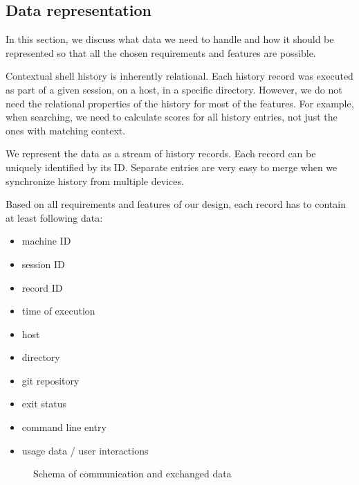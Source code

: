 \subsection{Data representation}

In this section, we discuss what data we need to handle and how it should be represented so that all the chosen requirements and features are possible.


Contextual shell history is inherently relational. Each history record was executed as part of a given session, on a host, in a specific directory. However, we do not need the relational properties of the history for most of the features. For example, when searching, we need to calculate scores for all history entries, not just the ones with matching context. 

We represent the data as a stream of history records. Each record can be uniquely identified by its ID. Separate entries are very easy to merge when we synchronize history from multiple devices.

Based on all requirements and features of our design, each record has to contain at least following data:
\begin{itemize}
\item machine ID
\item session ID
\item record ID
\item time of execution
\item host
\item directory
\item git repository
\item exit status
\item command line entry
\item usage data / user interactions
\end{itemize}



\begin{figure}[h!]
\centering
{}
\caption{Schema of communication and exchanged data}
\label{design-api}
\end{figure}


